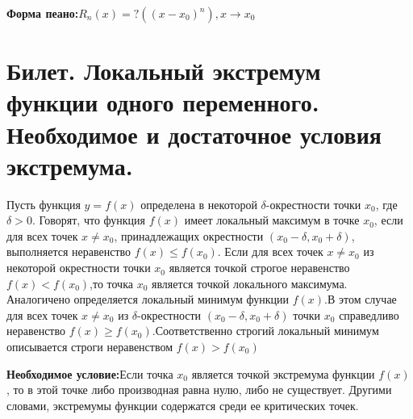 \documentclass[12pt]{article}
\begin{document}
	\textbf{Форма пеано:}$R_n(x)=? ((x-x_0)^n), x\to x_0$ 
	
	\section{Билет. Локальный экстремум функции одного переменного. Необходимое и достаточное условия экстремума.}
	
	Пусть функция $y=f(x)$ определена в некоторой $\delta$-окрестности точки $x_0$, где $\delta>0$. Говорят, что функция $f(x)$ имеет локальный максимум в точке $x_0$, если для всех точек $x\not=x_0$, принадлежащих окрестности $(x_0−\delta,x_0+\delta)$, выполняется неравенство $f(x)\le f(x_0)$. Если для всех точек $x\not=x_0$ из некоторой окрестности точки $x_0$ является точкой строгое неравенство $f(x)<f(x_0)$,то точка $x_0$ является точкой локального максимума. \\
	Аналогичено определяется локальный минимум функции $f(x)$.В этом случае для всех точек $x\not=x_0$ из $\delta$-окрестности $(x_0-\delta,x_0+\delta)$ точки $x_0$ справедливо неравенство $f(x)\ge f(x_0)$.Соответственно строгий локальный минимум описывается строги неравенством $f(x)>f(x_0)$
	
	\textbf{Необходимое условие:}Если точка $x_0$ является точкой экстремума функции $f(x)$, то в этой точке либо производная равна нулю, либо не существует. Другими словами, экстремумы функции содержатся среди ее критических точек. 
	
\end{document}
